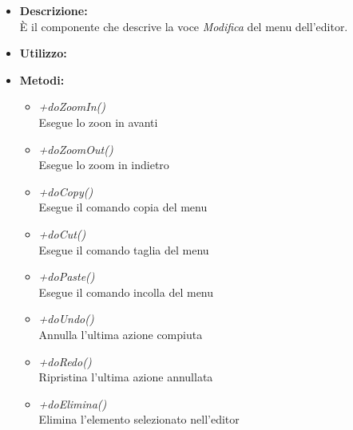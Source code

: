 \begin{itemize}
	\item \textbf{Descrizione:}\\
	È il componente che descrive la voce \textit{Modifica} del menu dell'editor.
	\item \textbf{Utilizzo:}\\
	
	\item \textbf{Metodi:}
		\begin{itemize}
			\item \emph{+doZoomIn()}\\
    		Esegue lo zoon in avanti
    		\item \emph{+doZoomOut()}\\
    		Esegue lo zoom in indietro
    		\item \emph{+doCopy()}\\
    		Esegue il comando copia del menu
    		\item \emph{+doCut()}\\
    		Esegue il comando taglia del menu
    		\item \emph{+doPaste()}\\
    		Esegue il comando incolla del menu
    		\item \emph{+doUndo()}\\
    		Annulla l'ultima azione compiuta
    		\item \emph{+doRedo()}\\
    		Ripristina l'ultima azione annullata
    		\item \emph{+doElimina()}\\
    		Elimina l'elemento selezionato nell'editor	    		
		\end{itemize}
\end{itemize}